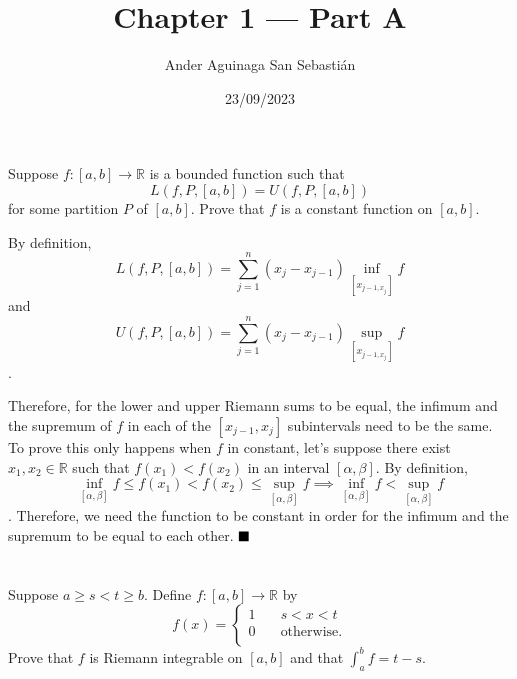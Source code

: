 \documentclass[11pt, a4paper, tikz]{article}
\newcommand{\newpara}{
	\vskip 2mm
}
\newcommand{\centsection}[1]{
	\section*{\centering{#1}}
}
\renewcommand{\qed}{\hfill\blacksquare}
\begin{document}
	\title{\textbf{Chapter 1 — Part A}}
	\author{Ander Aguinaga San Sebastián}
	\date{23/09/2023}
	\maketitle
	\centsection{Exercise 1}
	
	\begin{formulationBox}
		Suppose $f:[a,b]\rightarrow\mathbb{R}$ is a bounded function such that \[L(f,P,[a,b]) = U(f,P,[a,b])\] for some partition $P$ of $[a,b]$. Prove that $f$ is a constant function on $[a,b]$.
	\end{formulationBox}
	
	By definition,
	\begin{equation*}
		L(f, P, [a, b]) = \sum_{j=1}^{n}(x_j-x_{j-1})\inf_{[x_{j-1,x_j}]}f
	\end{equation*}
	and
		\begin{equation*}
		U(f, P, [a, b]) = \sum_{j=1}^{n}(x_j-x_{j-1})\sup_{[x_{j-1,x_j}]}f
	\end{equation*}
	.
	\newpara
	Therefore, for the lower and upper Riemann sums to be equal, the infimum and the supremum of $f$ in each of the $[x_{j-1},x_j]$ subintervals need to be the same. To prove this only happens when $f$ in constant, let's suppose there exist $x_1, x_2\in\mathbb{R}$ such that $f(x_1) < f(x_2)$ in an interval $[\alpha,\beta]$. By definition,
	\begin{equation*}
		\inf_{[\alpha,\beta]}f \leq f(x_1) < f(x_2) \leq  \sup_{[\alpha,\beta]}f \implies \inf_{[\alpha,\beta]}f < \sup_{[\alpha,\beta]}f
	\end{equation*}. Therefore, we need the function to be constant in order for the infimum and the supremum to be equal to each other.
	$\qed$
	
	\centsection{Exercise 2}
	
	\begin{formulationBox}
		Suppose $a\geq s<t\geq b$. Define $f:[a,b]\rightarrow\mathbb{R}$ by
		\[
			f(x) =
			\begin{cases}
				1 &\quad s<x<t\\
				0 &\quad \textrm{otherwise.}\\ 
			\end{cases}
		\]
		Prove that $f$ is Riemann integrable on $[a,b]$ and that $\int_a^bf=t-s$.
	\end{formulationBox}
	
\end{document}
